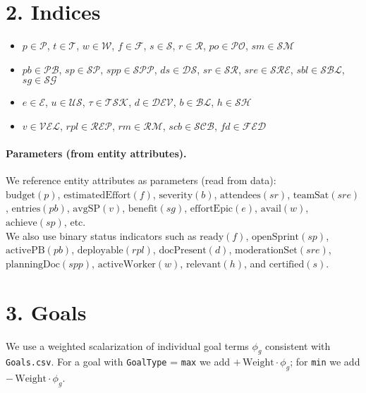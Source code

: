 \documentclass[a4paper,11pt]{article}
\begin{document}
\section{2. Indices}
\begin{itemize}[leftmargin=2em]
  \item $p\in\mathcal{P}$,\; $t\in\mathcal{T}$,\; $w\in\mathcal{W}$,\; $f\in\mathcal{F}$,\; $s\in\mathcal{S}$,\; $r\in\mathcal{R}$,\; $po\in\mathcal{PO}$,\; $sm\in\mathcal{SM}$
  \item $pb\in\mathcal{PB}$,\; $sp\in\mathcal{SP}$,\; $spp\in\mathcal{SPP}$,\; $ds\in\mathcal{DS}$,\; $sr\in\mathcal{SR}$,\; $sre\in\mathcal{SRE}$,\; $sbl\in\mathcal{SBL}$,\; $sg\in\mathcal{SG}$
  \item $e\in\mathcal{E}$,\; $u\in\mathcal{US}$,\; $\tau\in\mathcal{TSK}$,\; $d\in\mathcal{DEV}$,\; $b\in\mathcal{BL}$,\; $h\in\mathcal{SH}$
  \item $v\in\mathcal{VEL}$,\; $rpl\in\mathcal{REP}$,\; $rm\in\mathcal{RM}$,\; $scb\in\mathcal{SCB}$,\; $fd\in\mathcal{FED}$
\end{itemize}

\paragraph{Parameters (from entity attributes).}
We reference entity attributes as parameters (read from data):\\
$\mathrm{budget}(p)$, $\mathrm{estimatedEffort}(f)$, $\mathrm{severity}(b)$, $\mathrm{attendees}(sr)$, $\mathrm{teamSat}(sre)$, $\mathrm{entries}(pb)$, $\mathrm{avgSP}(v)$, $\mathrm{benefit}(sg)$, $\mathrm{effortEpic}(e)$, $\mathrm{avail}(w)$, $\mathrm{achieve}(sp)$, etc.\\
We also use binary status indicators such as $\mathrm{ready}(f)$, $\mathrm{openSprint}(sp)$, $\mathrm{activePB}(pb)$, $\mathrm{deployable}(rpl)$, $\mathrm{docPresent}(d)$, $\mathrm{moderationSet}(sre)$, $\mathrm{planningDoc}(spp)$, $\mathrm{activeWorker}(w)$, $\mathrm{relevant}(h)$, and $\mathrm{certified}(s)$.

\section{3. Goals}
We use a weighted scalarization of individual goal terms $\phi_g$ consistent with \texttt{Goals.csv}. For a goal with \texttt{GoalType} = \texttt{max} we add $+\,\mathrm{Weight}\cdot\phi_g$; for \texttt{min} we add $-\,\mathrm{Weight}\cdot\phi_g$.
\end{document}
